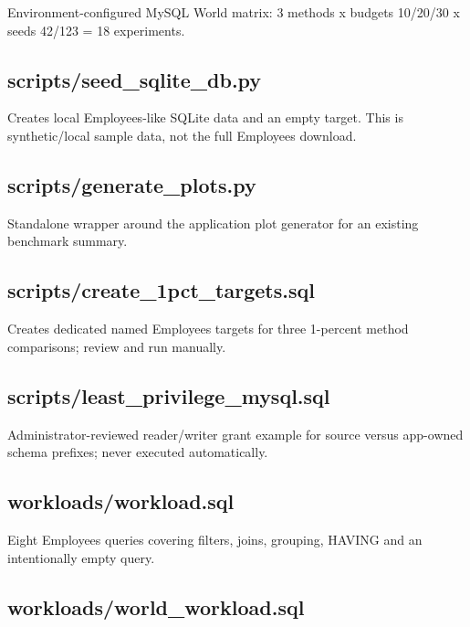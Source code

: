 Environment-configured MySQL World matrix: 3 methods x budgets 10/20/30 x seeds 42/123 = 18 experiments.


\subsection*{scripts/seed\_sqlite\_db.py}

Creates local Employees-like SQLite data and an empty target. This is synthetic/local sample data, not the full Employees download.


\subsection*{scripts/generate\_plots.py}

Standalone wrapper around the application plot generator for an existing benchmark summary.


\subsection*{scripts/create\_1pct\_targets.sql}

Creates dedicated named Employees targets for three 1-percent method comparisons; review and run manually.


\subsection*{scripts/least\_privilege\_mysql.sql}

Administrator-reviewed reader/writer grant example for source versus app-owned schema prefixes; never executed automatically.


\subsection*{workloads/workload.sql}

Eight Employees queries covering filters, joins, grouping, HAVING and an intentionally empty query.


\subsection*{workloads/world\_workload.sql}

